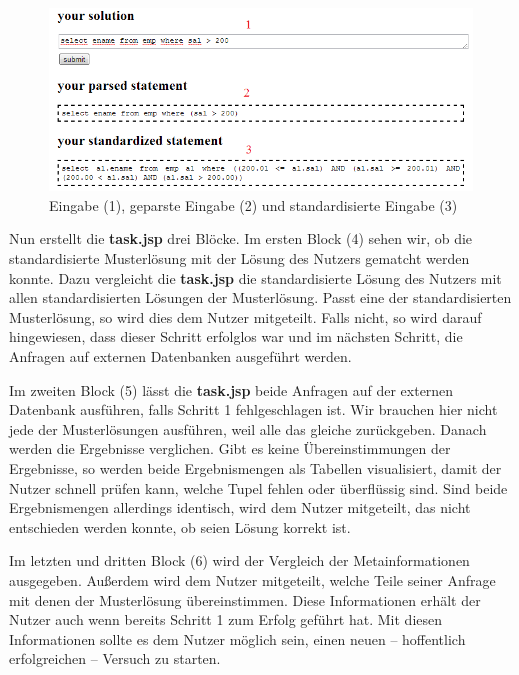 \begin{figure}[h]
\centering
\includegraphics[scale=0.7]{Bilder/screen_prog1}
\caption{Eingabe (1), geparste Eingabe (2) und standardisierte Eingabe (3)}
\label{fig:screen_prog1}
\end{figure}

Nun erstellt die \textbf{task.jsp} drei Blöcke. Im ersten Block (4) sehen wir, ob die standardisierte Musterlösung mit der Lösung des Nutzers gematcht werden konnte. Dazu vergleicht die \textbf{task.jsp} die standardisierte Lösung des Nutzers mit allen standardisierten Lösungen der Musterlösung. Passt eine der standardisierten Musterlösung, so wird dies dem Nutzer mitgeteilt. Falls nicht, so wird darauf hingewiesen, dass dieser Schritt erfolglos war und im nächsten Schritt, die Anfragen auf externen Datenbanken ausgeführt werden.

Im zweiten Block (5) lässt die \textbf{task.jsp} beide Anfragen auf der externen Datenbank ausführen, falls Schritt 1 fehlgeschlagen ist. Wir brauchen hier nicht jede der Musterlösungen ausführen, weil alle das gleiche zurückgeben. Danach werden die Ergebnisse verglichen. Gibt es keine Übereinstimmungen der Ergebnisse, so werden beide Ergebnismengen als Tabellen visualisiert, damit der Nutzer schnell prüfen kann, welche Tupel fehlen oder überflüssig sind. Sind beide Ergebnismengen allerdings identisch, wird dem Nutzer mitgeteilt, das nicht entschieden werden konnte, ob seien Lösung korrekt ist.

Im letzten und dritten Block (6) wird der Vergleich der Metainformationen ausgegeben. Außerdem wird dem Nutzer mitgeteilt, welche Teile seiner Anfrage mit denen der Musterlösung übereinstimmen. Diese Informationen erhält der Nutzer auch wenn bereits Schritt 1 zum Erfolg geführt hat. Mit diesen Informationen sollte es dem Nutzer möglich sein, einen neuen -- hoffentlich erfolgreichen -- Versuch zu starten.

